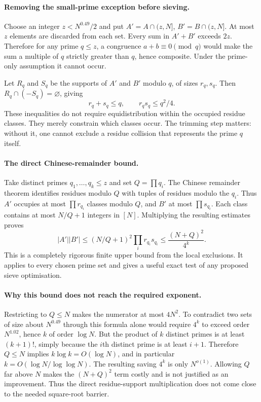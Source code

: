 \documentclass[11pt,a4paper]{article}
\begin{document}
\paragraph{Removing the small-prime exception before sieving.}
Choose an integer $z<N^{0.49}/2$ and put $A'=A\cap(z,N]$, $B'=B\cap(z,N]$. At most $z$ elements are discarded from each set. Every sum in $A'+B'$ exceeds $2z$. Therefore for any prime $q\leq z$, a congruence $a+b\equiv0\pmod q$ would make the sum a multiple of $q$ strictly greater than $q$, hence composite. Under the prime-only assumption it cannot occur.

Let $R_q$ and $S_q$ be the supports of $A'$ and $B'$ modulo $q$, of sizes $r_q,s_q$. Then $R_q\cap(-S_q)=\varnothing$, giving
\[
 r_q+s_q\leq q,\qquad r_qs_q\leq q^2/4.
\]
These inequalities do not require equidistribution within the occupied residue classes. They merely constrain which classes occur. The trimming step matters: without it, one cannot exclude a residue collision that represents the prime $q$ itself.

\paragraph{The direct Chinese-remainder bound.}
Take distinct primes $q_1,\ldots,q_k\leq z$ and set $Q=\prod q_i$. The Chinese remainder theorem identifies residues modulo $Q$ with tuples of residues modulo the $q_i$. Thus $A'$ occupies at most $\prod r_{q_i}$ classes modulo $Q$, and $B'$ at most $\prod s_{q_i}$. Each class contains at most $N/Q+1$ integers in $[N]$. Multiplying the resulting estimates proves
\[
 |A'||B'|\leq(N/Q+1)^2\prod_i r_{q_i}s_{q_i}
 \leq\frac{(N+Q)^2}{4^k}.
\]
This is a completely rigorous finite upper bound from the local exclusions. It applies to every chosen prime set and gives a useful exact test of any proposed sieve optimisation.

\paragraph{Why this bound does not reach the required exponent.}
Restricting to $Q\leq N$ makes the numerator at most $4N^2$. To contradict two sets of size about $N^{0.49}$ through this formula alone would require $4^k$ to exceed order $N^{1.02}$, hence $k$ of order $\log N$. But the product of $k$ distinct primes is at least $(k+1)!$, simply because the $i$th distinct prime is at least $i+1$. Therefore $Q\leq N$ implies $k\log k=O(\log N)$, and in particular $k=O(\log N/\log\log N)$. The resulting saving $4^k$ is only $N^{o(1)}$. Allowing $Q$ far above $N$ makes the $(N+Q)^2$ term costly and is not justified as an improvement. Thus the direct residue-support multiplication does not come close to the needed square-root barrier.
\end{document}
